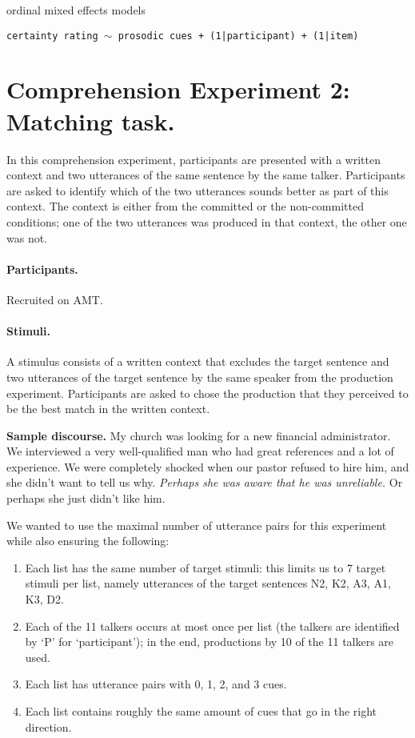 \documentclass[dina4,12pt,fleqn]{article}
\newcommand{\6}{\mbox{$[\hspace*{-.6mm}[$}}
\newcommand{\9}{\mbox{$]\hspace*{-.6mm}]$}}
\begin{document}
ordinal mixed effects models

{\tt certainty rating $\sim$ prosodic cues + (1|participant)  + (1|item)}


\section{Comprehension Experiment 2: Matching task.}

In this comprehension experiment, participants are presented with a written context and two utterances of the same sentence by the same talker. Participants are asked to identify which of the two utterances sounds better as part of this context. The context is either from the committed or the non-committed conditions; one of the two utterances was produced in that context, the other one was not.

\paragraph{Participants.} Recruited on AMT.

\paragraph{Stimuli.} A stimulus consists of a written context that excludes the target sentence and two utterances of the target sentence by the same speaker from the production experiment. Participants are asked to chose the production that they perceived to be the best match in the written context.

\begin{exe}
\ex \textbf{Sample discourse. }My church was looking for a new financial administrator. We interviewed a
very well-qualified man who had great references and a lot of
experience. We were completely shocked when our pastor refused to hire
him, and she didn't want to tell us why. \textit{Perhaps she was aware that he was unreliable.} Or perhaps she just didn't like him. 
\end{exe}

We wanted to use the maximal number of utterance pairs for this experiment while also ensuring the following:

\begin{enumerate}[noitemsep]
\item Each list has the same number of target stimuli: this limits us to 7 target stimuli per list, namely utterances of the target sentences N2, K2, A3, A1, K3, D2.
    \item Each of the 11 talkers occurs at most once per list (the talkers are identified by `P' for `participant'); in the end, productions by 10 of the 11 talkers are used.
    \item Each list has utterance pairs with 0, 1, 2, and 3 cues.
    \item Each list contains roughly the same amount of cues that go in the right direction.
\end{enumerate}
\end{document}
